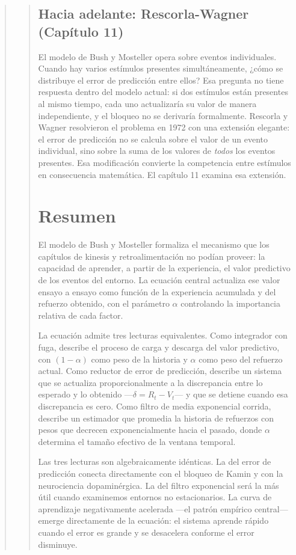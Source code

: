 \documentclass[
  letterpaper,
  DIV=11,
  numbers=noendperiod]{scrreprt}
\begin{document}
\begin{tcolorbox}[enhanced jigsaw, toprule=.15mm, arc=.35mm, colback=white, opacityback=0, colframe=quarto-callout-note-color-frame, breakable, rightrule=.15mm, left=2mm, leftrule=.75mm, bottomrule=.15mm]
\begin{quote}
\begin{quote}
\subsection{Hacia adelante: Rescorla-Wagner (Capítulo
11)}\label{hacia-adelante-rescorla-wagner-capuxedtulo-11}

El modelo de Bush y Mosteller opera sobre eventos individuales. Cuando
hay varios estímulos presentes simultáneamente, ¿cómo se distribuye el
error de predicción entre ellos? Esa pregunta no tiene respuesta dentro
del modelo actual: si dos estímulos están presentes al mismo tiempo,
cada uno actualizaría su valor de manera independiente, y el bloqueo no
se derivaría formalmente. Rescorla y Wagner resolvieron el problema en
1972 con una extensión elegante: el error de predicción no se calcula
sobre el valor de un evento individual, sino sobre la suma de los
valores de \emph{todos} los eventos presentes. Esa modificación
convierte la competencia entre estímulos en consecuencia matemática. El
capítulo 11 examina esa extensión.

\section{Resumen}\label{resumen-4}

El modelo de Bush y Mosteller formaliza el mecanismo que los capítulos
de kinesis y retroalimentación no podían proveer: la capacidad de
aprender, a partir de la experiencia, el valor predictivo de los eventos
del entorno. La ecuación central actualiza ese valor ensayo a ensayo
como función de la experiencia acumulada y del refuerzo obtenido, con el
parámetro \(\alpha\) controlando la importancia relativa de cada factor.

La ecuación admite tres lecturas equivalentes. Como integrador con fuga,
describe el proceso de carga y descarga del valor predictivo, con
\((1-\alpha)\) como peso de la historia y \(\alpha\) como peso del
refuerzo actual. Como reductor de error de predicción, describe un
sistema que se actualiza proporcionalmente a la discrepancia entre lo
esperado y lo obtenido ---\(\delta = R_t - V_t\)--- y que se detiene
cuando esa discrepancia es cero. Como filtro de media exponencial
corrida, describe un estimador que promedia la historia de refuerzos con
pesos que decrecen exponencialmente hacia el pasado, donde \(\alpha\)
determina el tamaño efectivo de la ventana temporal.

Las tres lecturas son algebraicamente idénticas. La del error de
predicción conecta directamente con el bloqueo de Kamin y con la
neurociencia dopaminérgica. La del filtro exponencial será la más útil
cuando examinemos entornos no estacionarios. La curva de aprendizaje
negativamente acelerada ---el patrón empírico central--- emerge
directamente de la ecuación: el sistema aprende rápido cuando el error
es grande y se desacelera conforme el error disminuye.


\end{quote}
\end{quote}
\end{tcolorbox}
\end{document}
